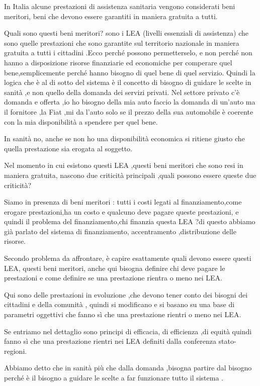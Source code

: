 In Italia alcune prestazioni di assistenza sanitaria vengono considerati
beni meritori, beni che devono essere garantiti in maniera gratuita a
tutti.

Quali sono questi beni meritori? sono i LEA (livelli essenziali di
assistenza) che sono quelle prestazioni che sono garantite sul
territorio nazionale in maniera gratuita a tutti i cittadini .Ecco
perché possono permetterselo, e non perché non hanno a disposizione
risorse finanziarie ed economiche per comperare quel bene,semplicemente
perché hanno bisogno di quel bene di quel servizio. Quindi la logica che
è al di sotto del sistema è il concetto di bisogno di guidare le scelte
in sanità ,e non quello della domanda dei servizi privati. Nel settore
privato c'è domanda e offerta ,io ho bisogno della mia auto faccio la
domanda di un'auto ma il fornitore ,la Fiat ,mi da l'auto solo se il
prezzo della sua automobile è coerente con la mia disponibilità a
spendere per quel bene.

In sanità no, anche se non ho una disponibilità economica si ritiene
giusto che quella prestazione sia erogata al soggetto.

Nel momento in cui esistono questi LEA ,questi beni meritori che sono
resi in maniera gratuita, nascono due criticità principali ,quali
possono essere queste due criticità?

Siamo in presenza di beni meritori : tutti i costi legati al
finanziamento,come erogare prestazioni,ha un costo e qualcuno deve
pagare queste prestazioni, e quindi il problema del finanziamento,chi
finanzia questa LEA ?di questo abbiamo già parlato del sistema di
finanziamento, accentramento ,distribuzione delle risorse.

Secondo problema da affrontare, è capire esattamente quali devono essere
questi LEA, questi beni meritori, anche qui bisogna definire chi deve
pagare le prestazioni e come definire se una prestazione rientra o meno
nei LEA.

Qui sono delle prestazioni in evoluzione ,che devono tener conto dei
bisogni dei cittadini e della comunità , quindi si modificano e si
basano su una base di parametri oggettivi che fanno sì che una
prestazione rientri o meno nei LEA.

Se entriamo nel dettaglio sono principi di efficacia, di efficienza ,di
equità quindi fanno sì che una prestazione rientri nei LEA definiti
dalla conferenza stato-regioni.

Abbiamo detto che in sanità più che dalla domanda ,bisogna partire dal
bisogno perché è il bisogno a guidare le scelte a far funzionare tutto
il sistema .

